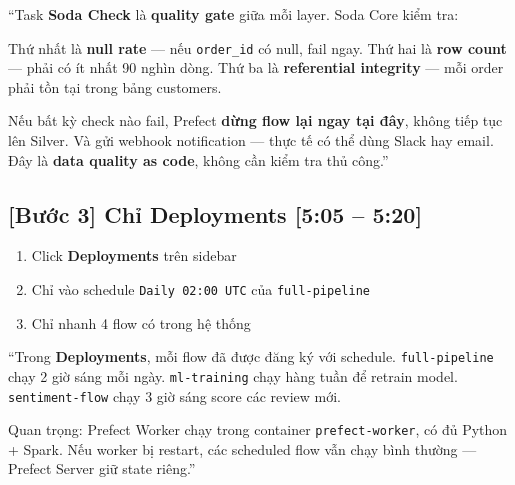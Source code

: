 \documentclass[12pt, a4paper]{article}
\newenvironment{speakerbox}[2]{%
  \begin{tcolorbox}[
    enhanced, breakable,
    colback=#1!6!white, colframe=#1,
    colbacktitle=#1, coltitle=white,
    fonttitle=\bfseries\large,
    title={#2},
    arc=4pt, boxrule=1.5pt,
    left=8pt, right=8pt, top=6pt, bottom=6pt,
  ]
}{\end{tcolorbox}}
\newcommand{\timing}[1]{\hfill{\small\bfseries\color{gray}[#1]}}
\newcommand{\code}[1]{\texttt{\small#1}}
\begin{document}
\begin{speakerbox}{p2color}{\faUser\ Người 2 \textbullet\ 4:30 -- 5:20 \textbullet\ DEMO Prefect UI}
\begin{scriptbox}
``Task \textbf{Soda Check} là \textbf{quality gate} giữa mỗi layer. Soda Core kiểm tra:

Thứ nhất là \textbf{null rate} --- nếu \code{order\_id} có null, fail ngay.
Thứ hai là \textbf{row count} --- phải có ít nhất 90 nghìn dòng.
Thứ ba là \textbf{referential integrity} --- mỗi order phải tồn tại trong bảng
customers.

Nếu bất kỳ check nào fail, Prefect \textbf{dừng flow lại ngay tại
đây}, không tiếp tục lên Silver. Và gửi webhook notification ---
thực tế có thể dùng Slack hay email. Đây là \textbf{data quality as
code}, không cần kiểm tra thủ công.''
\end{scriptbox}

\subsection*{[Bước 3] Chỉ Deployments \timing{5:05 -- 5:20}}

\begin{demobox}
\begin{enumerate}[leftmargin=1.5em, itemsep=3pt]
  \item Click \textbf{Deployments} trên sidebar
  \item Chỉ vào schedule \code{Daily 02:00 UTC} của \code{full-pipeline}
  \item Chỉ nhanh 4 flow có trong hệ thống
\end{enumerate}
\end{demobox}

\begin{scriptbox}
``Trong \textbf{Deployments}, mỗi flow đã được đăng ký với schedule.
\code{full-pipeline} chạy 2 giờ sáng mỗi ngày. \code{ml-training} chạy hàng
tuần để retrain model. \code{sentiment-flow} chạy 3 giờ sáng score các
review mới.

Quan trọng: Prefect Worker chạy trong container
\code{prefect-worker}, có đủ Python + Spark. Nếu worker bị restart,
các scheduled flow vẫn chạy bình thường --- Prefect Server giữ
state riêng.''
\end{scriptbox}

\end{speakerbox}

\vspace{0.5em}
\end{document}
